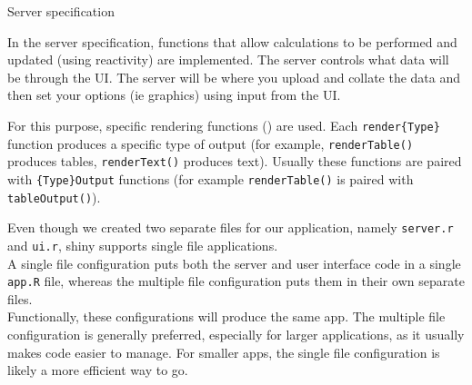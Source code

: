  \begin{description}
\item[Server specification]
\end{description}
 In the server specification, functions that allow calculations to be performed and updated (using reactivity) are implemented. The server controls what data will be through the UI. The server will be where you upload and collate the data and then set your options (ie graphics) using input from the UI.
 
 
 For this purpose, specific rendering functions ({}) are used. Each \verb!render{Type}! function produces a specific type of output (for example, \verb!renderTable()! produces tables, \verb!renderText()! produces text). Usually these functions are paired with \verb!{Type}Output! functions (for example \verb!renderTable()!  is paired with \verb!tableOutput()!).


 
 Even though we created two separate files for our application, namely \verb!server.r! and \verb!ui.r!, shiny supports single file applications. 
 \\
 A single file configuration puts both the server and user interface code in a single \verb!app.R! file, whereas the multiple file configuration puts them in their own separate files. 
 \\
 Functionally, these configurations will produce the same app. The multiple file configuration is generally preferred, especially for larger applications, as it usually makes code easier to manage. For smaller apps, the single file configuration is likely a more efficient way to go.
